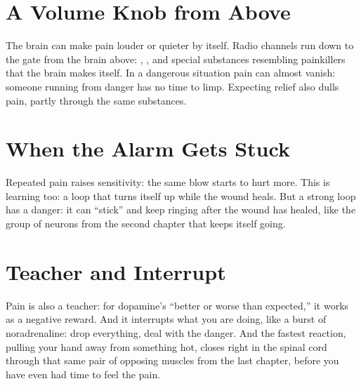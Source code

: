 \section*{A Volume Knob from Above}

The brain can make pain louder or quieter by itself. Radio channels run down to the gate from the brain above: , , and special substances resembling painkillers that the brain makes itself. In a dangerous situation pain can almost vanish: someone running from danger has no time to limp. Expecting relief also dulls pain, partly through the same substances.

\section*{When the Alarm Gets Stuck}

Repeated pain raises sensitivity: the same blow starts to hurt more. This is learning too: a loop that turns itself up while the wound heals. But a strong loop has a danger: it can ``stick'' and keep ringing after the wound has healed, like the group of neurons from the second chapter that keeps itself going.

\section*{Teacher and Interrupt}

Pain is also a teacher: for dopamine's ``better or worse than expected,'' it works as a negative reward. And it interrupts what you are doing, like a burst of noradrenaline: drop everything, deal with the danger. And the fastest reaction, pulling your hand away from something hot, closes right in the spinal cord through that same pair of opposing muscles from the last chapter, before you have even had time to feel the pain.

